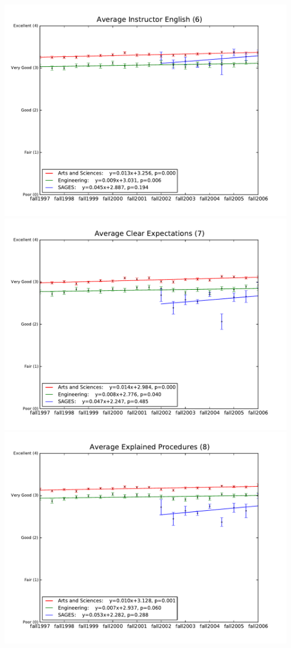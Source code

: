 \documentclass[12pt]{article}
\begin{document}
\begin{center}
    \includegraphics[width=5in]{figures/6_english_over_time.pdf} \\
    \includegraphics[width=5in]{figures/7_expectations_over_time.pdf} \\
    \includegraphics[width=5in]{figures/8_procedures_over_time.pdf} \\

\end{center}
\end{document}
